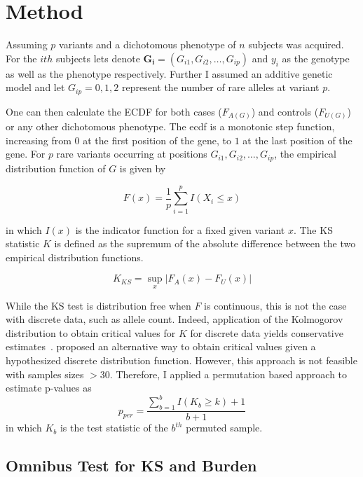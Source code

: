 \section{Method}
\label{sec:method}

Assuming $p$ variants and a dichotomous phenotype of $n$ subjects was acquired.
For the $ith$ subjects lets denote $\bm{G_i} = (G_{i1}, G_{i2},\ldots , G_{ip})$ and $y_i$ as the genotype as well as the phenotype respectively.
Further I assumed an additive genetic model and let $G_{ip} = 0, 1, 2$ represent the number of rare alleles at variant $p$.  

One can then calculate the \acrfull{ECDF} for both cases ($F_{A(G)}$) and controls ($F_{U(G)}$) or any other dichotomous phenotype.
The ecdf is a monotonic step function, increasing from $0$ at the first position of the gene, to $1$ at the last position of the gene.
For $p$ rare variants occurring at positions  $G_{i1}, G_{i2}, \ldots, G_{ip}$, the empirical distribution function of $G$ is given by

\begin{equation}
  F(x) = \frac{1}{p}\sum^p_{i=1}I(X_i \leq x)
\end{equation}

in which $I(x)$ is the indicator function for a fixed given variant $x$.
The KS statistic $K$ is defined as the supremum of the absolute difference between the two empirical distribution functions.

\begin{equation}
	K_{KS} = \sup_x | F_A(x) - F_U(x) |
\end{equation}

While the KS test is distribution free when $F$ is continuous, this is not the case with discrete data, such as allele count.
Indeed, application of the Kolmogorov distribution to obtain critical values for $K$ for discrete data yields conservative estimates~\cite{Walsh1963,Conover1972}. 
\citet{Conover1972} proposed an alternative way to obtain critical values given a hypothesized discrete distribution function.
However, this approach is not feasible with samples sizes $>30$.
Therefore, I applied a permutation based approach to estimate p-values as 
\begin{equation}
  p_{per} = \frac{\sum^b_{b=1} I(K_b \geq k)+1}{b+1}
\end{equation}
in which $K_b$ is the test statistic of the $b^{th}$ permuted sample.

\subsection{Omnibus Test for KS and Burden}
\label{sub:omnibus_test_for_ks_and_burden}

